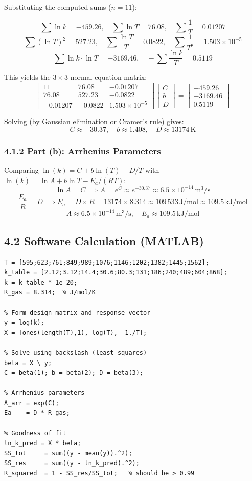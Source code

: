 \documentclass[12pt,a4paper]{article}
\begin{document}
Substituting the computed sums ($n = 11$):

\[
\sum\ln k = -459.26, \quad \sum\ln T = 76.08, \quad \sum\frac{1}{T} = 0.01207
\]
\[
\sum(\ln T)^2 = 527.23, \quad \sum\frac{\ln T}{T} = 0.0822, \quad \sum\frac{1}{T^2} = 1.503\times10^{-5}
\]
\[
\sum\ln k\cdot\ln T = -3169.46, \quad -\sum\frac{\ln k}{T} = 0.5119
\]

This yields the $3\times3$ normal-equation matrix:
\[
\begin{bmatrix}
11 & 76.08 & -0.01207 \\
76.08 & 527.23 & -0.0822 \\
-0.01207 & -0.0822 & 1.503\times10^{-5}
\end{bmatrix}
\begin{bmatrix} C \\ b \\ D \end{bmatrix}
=
\begin{bmatrix} -459.26 \\ -3169.46 \\ 0.5119 \end{bmatrix}
\]

Solving (by Gaussian elimination or Cramer's rule) gives:
\[
\boxed{C \approx -30.37, \quad b \approx 1.408, \quad D \approx 13174\,\text{K}}
\]

\subsubsection{4.1.2 Part (b): Arrhenius Parameters}

Comparing $\ln(k) = C + b\ln(T) - D/T$ with $\ln(k) = \ln A + b\ln T - E_a/(RT)$:
\[
\ln A = C \implies A = e^C \approx e^{-30.37} \approx 6.5\times10^{-14}\,\text{m}^3/\text{s}
\]
\[
\frac{E_a}{R} = D \implies E_a = D \times R = 13174 \times 8.314 \approx 109\,533\,\text{J/mol} \approx 109.5\,\text{kJ/mol}
\]
\[
\boxed{A \approx 6.5\times10^{-14}\,\text{m}^3/\text{s}, \quad E_a \approx 109.5\,\text{kJ/mol}}
\]

\subsection{4.2 Software Calculation (MATLAB)}

\begin{lstlisting}[style=matlabstyle, caption={Q4 -- Least-squares regression in MATLAB}]
T = [595;623;761;849;989;1076;1146;1202;1382;1445;1562];
k_table = [2.12;3.12;14.4;30.6;80.3;131;186;240;489;604;868];
k = k_table * 1e-20;
R_gas = 8.314;  % J/mol/K

% Form design matrix and response vector
y = log(k);
X = [ones(length(T),1), log(T), -1./T];

% Solve using backslash (least-squares)
beta = X \ y;
C = beta(1); b = beta(2); D = beta(3);

% Arrhenius parameters
A_arr = exp(C);
Ea    = D * R_gas;

% Goodness of fit
ln_k_pred = X * beta;
SS_tot     = sum((y - mean(y)).^2);
SS_res     = sum((y - ln_k_pred).^2);
R_squared  = 1 - SS_res/SS_tot;   % should be > 0.99
\end{lstlisting}
\end{document}
